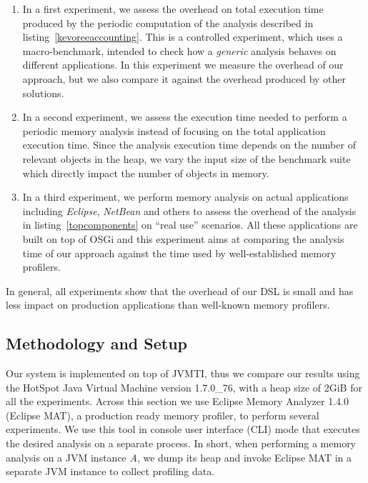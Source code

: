 \begin{enumerate}
\item In a first experiment, we assess the overhead on total execution time produced by the periodic computation of the analysis described in listing~\ref{kevoreeaccounting}.
This is a controlled experiment, which uses a macro-benchmark, intended to check how a \textit{generic} analysis behaves on different applications.
In this experiment we measure the overhead of our approach, but we also compare it against the overhead produced by other solutions.

\item In a second experiment, we assess the execution time needed to perform a periodic memory analysis instead of focusing on the total application execution time.
Since the analysis execution time depends on the number of relevant objects in the heap, we vary the input size of the benchmark suite which directly impact the number of objects in memory.

\item In a third experiment, we perform memory analysis on actual applications including \textit{Eclipse}, \textit{NetBean} and others to assess the overhead of the analysis in listing~\ref{topcomponents} on ``real use'' scenarios.
All these applications are built on top of OSGi and this experiment aims at comparing the analysis time of our approach against the time used by well-established memory profilers.  
\end{enumerate}

In general, all experiments show that the overhead of our DSL is small and has less impact on production applications than well-known memory profilers.

\subsection{Methodology and Setup}\label{sec:MethodologyAndSetup}
Our system is implemented on top of JVMTI, thus we compare our results using the HotSpot Java Virtual Machine version 1.7.0\_76, with a heap size of 2GiB for all the experiments.
Across this section we use Eclipse Memory Analyzer 1.4.0 (Eclipse MAT),  a production ready memory profiler, to perform several experiments.
We use  this tool in console user interface (CLI) mode that executes the desired analysis on a separate process.
In short, when performing a memory analysis on a JVM instance \textit{A}, we dump its heap and invoke Eclipse MAT in a separate JVM instance to collect profiling data.

